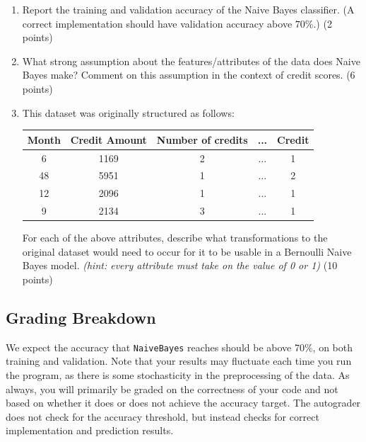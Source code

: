 \documentclass{article}
\begin{document}
\begin{enumerate}
    \item Report the training and validation accuracy of the Naive Bayes classifier. (A correct implementation should have validation accuracy above $70\%$.) (2 points)
    
    \item What strong assumption about the features/attributes of the data does Naive Bayes make? Comment on this assumption in the context of credit scores. (6 points)

    
    \item This dataset was originally structured as follows:

    \begin{center}
    \begin{tabular}{| c | c | c | c || c |}
        \hline
    	 Month & Credit Amount & Number of credits & ... & Credit\\
    	\hline
    	6 & 1169 & 2 & ... & 1 \\
    	48 & 5951 & 1 & ... & 2\\
    	12 & 2096 & 1 & ... & 1\\
    	9 & 2134 & 3 & ... & 1 \\
    	\hline
    \end{tabular}
    \end{center}
    For each of the above attributes, describe what transformations to the original dataset would need to occur for it to be usable in a Bernoulli Naive Bayes model. \textit{(hint: every attribute must take on the value of 0 or 1)} (10 points)

        
    
    
    
\end{enumerate}


\subsection*{Grading Breakdown}
We expect the accuracy that \texttt{NaiveBayes} reaches should be above 70\%, on both training and validation. Note that your results may fluctuate each time you run the program, as there is some stochasticity in the preprocessing of the data.
As always, you will primarily be graded on the correctness of your code and not based on whether it does or does not achieve the accuracy target. The autograder does not check for the accuracy threshold, but instead checks for correct implementation and prediction results.
\end{document}
